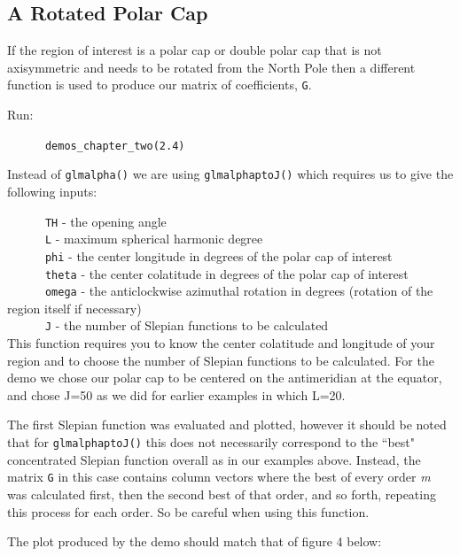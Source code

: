 \documentclass[11pt]{article}
\begin{document}
\subsection{A Rotated Polar Cap}

If the region of interest is a polar cap or double polar cap that is not axisymmetric and needs to be rotated from the North Pole then a different function is used to produce our matrix of coefficients, \verb|G|.

Run:

\verb|		demos_chapter_two(2.4)|

Instead of \verb|glmalpha()| we are using \verb|glmalphaptoJ()| which requires us to give the following inputs:

\verb|		TH| - the opening angle \\
\verb|		L| - maximum spherical harmonic degree \\
\verb|		phi| - the center longitude in degrees of the polar cap of interest \\
\verb|		theta| - the center colatitude in degrees of the polar cap of interest \\
\verb|		omega| - the anticlockwise azimuthal rotation in degrees (rotation of the region itself if necessary) \\
\verb|		J| - the number of Slepian functions to be calculated \\

This function requires you to know the center colatitude and longitude of your region and to choose the number of Slepian functions to be calculated. For the demo we chose our polar cap to be centered on the antimeridian at the equator, and chose J=50 as we did for earlier examples in which L=20. 

The first Slepian function was evaluated and plotted, however it should be noted that for \verb|glmalphaptoJ()| this does not necessarily correspond to the ``best" concentrated Slepian function overall as in our examples above. Instead, the matrix \verb|G| in this case contains column vectors where the best of every order \textit{m} was calculated first, then the second best of that order, and so forth, repeating this process for each order. So be careful when using this function. 

The plot produced by the demo should match that of figure 4 below:
\end{document}
